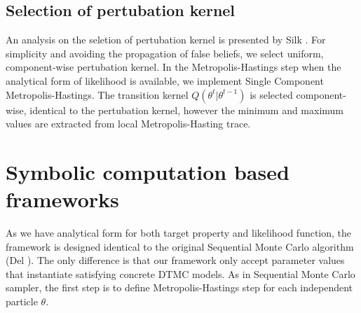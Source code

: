 \subsection{Selection of pertubation kernel}
An analysis on the seletion of pertubation kernel is presented by Silk \cite{silk2012optimizing}. For
simplicity and avoiding the propagation of false beliefs, we select uniform, component-wise
pertubation kernel. In the Metropolis-Hastings step when the analytical form of likelihood is
available, we implement Single Component Metropolis-Hastings. The transition kernel
$Q(\theta^t|\theta^{t-1})$ is selected component-wise, identical to the pertubation kernel, however
the minimum and maximum values are extracted from local Metropolis-Hasting trace.

\section{Symbolic computation based frameworks}
As we have analytical form for both target property and likelihood function, the framework is
designed identical to the original Sequential Monte Carlo algorithm (Del \cite{del2006sequential}). The
only difference is that our framework only accept parameter values that instantiate satisfying
concrete DTMC models. As in Sequential Monte Carlo sampler, the first step is to define
Metropolis-Hastings step for each independent particle $\theta$.

